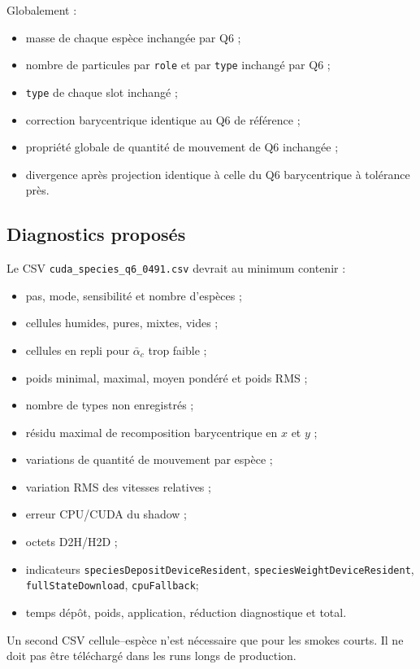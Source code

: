 \documentclass[11pt,a4paper]{article}
\newcommand{\code}[1]{\texttt{#1}}
\begin{document}
Globalement :
\begin{itemize}
  \item masse de chaque espèce inchangée par Q6 ;
  \item nombre de particules par \code{role} et par \code{type} inchangé par Q6 ;
  \item \code{type} de chaque slot inchangé ;
  \item correction barycentrique identique au Q6 de référence ;
  \item propriété globale de quantité de mouvement de Q6 inchangée ;
  \item divergence après projection identique à celle du Q6 barycentrique à tolérance près.
\end{itemize}

\subsection{Diagnostics proposés}

Le CSV \code{cuda\_species\_q6\_0491.csv} devrait au minimum contenir :
\begin{itemize}
  \item pas, mode, sensibilité et nombre d'espèces ;
  \item cellules humides, pures, mixtes, vides ;
  \item cellules en repli pour \(\bar\alpha_c\) trop faible ;
  \item poids minimal, maximal, moyen pondéré et poids RMS ;
  \item nombre de types non enregistrés ;
  \item résidu maximal de recomposition barycentrique en \(x\) et \(y\) ;
  \item variations de quantité de mouvement par espèce ;
  \item variation RMS des vitesses relatives ;
  \item erreur CPU/CUDA du shadow ;
  \item octets D2H/H2D ;
  \item indicateurs \code{speciesDepositDeviceResident}, \code{speciesWeightDeviceResident}, \code{fullStateDownload}, \code{cpuFallback};
  \item temps dépôt, poids, application, réduction diagnostique et total.
\end{itemize}

Un second CSV cellule--espèce n'est nécessaire que pour les smokes courts. Il ne doit pas être téléchargé dans les runs longs de production.
\end{document}
